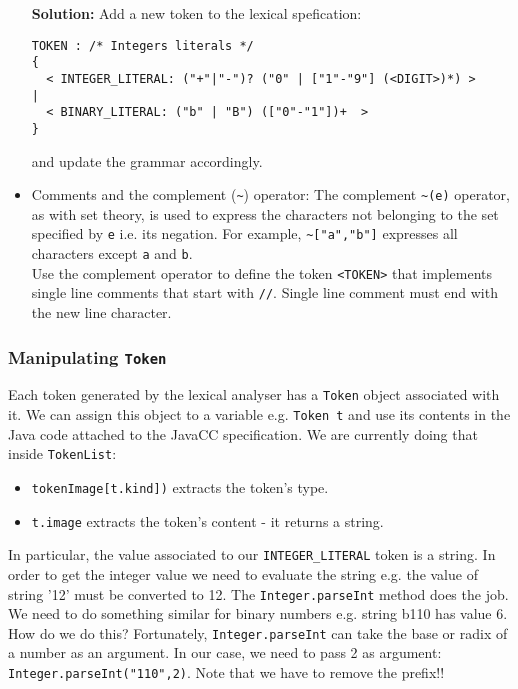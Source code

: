 \documentclass{article}
\begin{document}
\begin{itemize}
\noindent \textbf{Solution:} Add a new token to the lexical spefication:
\begin{verbatim}
TOKEN : /* Integers literals */
{
  < INTEGER_LITERAL: ("+"|"-")? ("0" | ["1"-"9"] (<DIGIT>)*) >
|
  < BINARY_LITERAL: ("b" | "B") (["0"-"1"])+  >
}
\end{verbatim}

and update the grammar accordingly.

\item Comments and the complement (\verb+~+) operator:
The complement \verb+~(e)+ operator, as with set theory, is used to express the characters not belonging to the set specified by \verb+e+ i.e. its negation. For example, \verb+~["a","b"]+ expresses all characters except \verb+a+ and \verb+b+.\\
Use the complement operator to define the token \verb+<TOKEN>+ that implements single line comments that start with \verb+//+. Single line comment must end with the new line character.\\

\end{itemize}


\subsubsection*{Manipulating {\tt Token}}

Each token generated by the lexical analyser has a {\tt Token} object associated with it. We can assign this object to a variable e.g. {\tt Token t} and use its contents in the Java code attached to the JavaCC specification. We are currently doing that inside {\tt TokenList}:
\begin{itemize}
\item \verb+tokenImage[t.kind])+ extracts the token's type.
\item \verb+t.image+ extracts the token's content - it returns a string.
\end{itemize}

In particular, the value associated to our \verb+INTEGER_LITERAL+ token is a string. In order to get the integer value we need to evaluate the string  e.g. the value of string '12' must be converted to 12. The {\tt Integer.parseInt} method does the job. We need to do something similar for binary numbers e.g. string b110 has value 6. How do we do this? Fortunately, {\tt Integer.parseInt} can take the base or radix of a number as an argument. In our case, we need to pass 2 as argument: \verb+Integer.parseInt("110",2)+. Note that we have to remove the prefix!!
\end{document}
